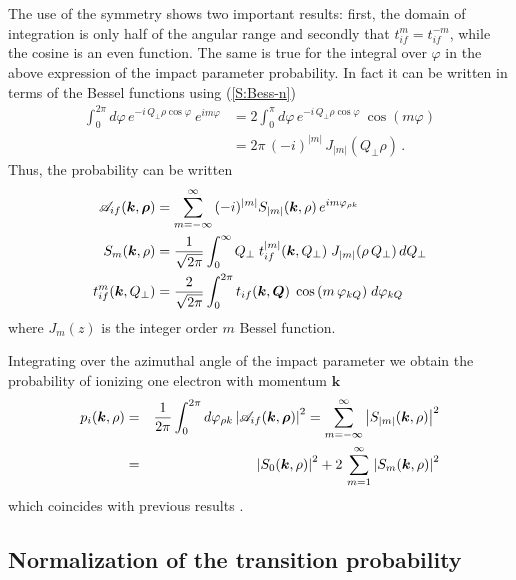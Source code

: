 The use of the symmetry shows two important results: first, the domain
of integration is only half of the angular range and secondly that
$t^{m}_{if} = t^{-m}_{if}$, while the cosine is an even function. The
same is true for the integral over $\varphi$ in the above expression of
the impact parameter probability. In fact it can be written in terms of
the Bessel functions using (\ref{S:Bess-n})
\begin{align}
  \int_{0}^{2 \pi} d \varphi \,
e^{- i \, Q_{\perp} \rho \cos{\varphi}}\ e^{i m \varphi} \nonumber
&=2
 \int_{0}^{\pi} d \varphi \, e^{- i \, Q_{\perp} \rho
\cos{\varphi}}\ \cos{(m \varphi)}
\\
&= 2 \pi \, (-i)^{|m| } \, J_{|m| }(Q_{\perp} \rho) \,.
\end{align}
%
Thus, the probability can be written
\begin{subequations}
  \begin{align}
    \mathcal{A}_{if}(\bm{k},\boldsymbol{\rho}) &= \sum_{m=-\infty}^{\infty} \, (-i)^{|m| } S_{|m|
    }(\bm{k}, \rho) \, e^{i m \varphi_{\rho k}}
    \\
    S_{m}(\bm{k}, \rho) &= \frac{1}{\sqrt{2 \pi}} \int_{0}^{\infty} Q_{\perp} \; t^{|m|
    }_{if}(\bm{k},Q_{\perp}) \; J_{|m| }(\rho \, Q_{\perp}) \, d
    Q_{\perp} \\
    t^{m}_{if}(\bm{k},Q_{\perp}) &= \frac{2}{\sqrt{2 \pi}} \int_{0}^{2 \pi}
    t_{if}(\bm{k},\bm{Q}) \; \cos{(m \, \varphi_{k Q})} \; d \varphi_{k Q}
  \end{align}
\end{subequations}
where $J_{m}(z)$ is the integer order $m$ Bessel function.

Integrating over the azimuthal angle of the impact parameter we obtain
the probability of ionizing one electron with momentum $\bm{k}$
\begin{eqnarray}\label{Q:prob2}
p_{i} (\bm{k}, \rho) &=& \frac{1}{2 \pi} \int_{0}^{2 \pi} d
\varphi_{\rho k} \left|  \mathcal{A}_{if}(\bm{k},\boldsymbol{\rho}) \right| ^{2} =
\sum_{m=-\infty}^{\infty} \left|  S_{|m| }(\bm{k}, \rho) \right| ^{2}
\nonumber
\\
&=& \left|  S_{0}(\bm{k},\rho) \right| ^{2} + 2 \, \sum_{m=1}^{\infty}
\left| S_{m}(\bm{k},\rho) \right| ^{2}
\end{eqnarray}
%
which coincides with previous results \cite{Galassi2002JPBp1727}.

\subsection{Normalization of the transition probability}
\label{S:Norma-trans-proba}

